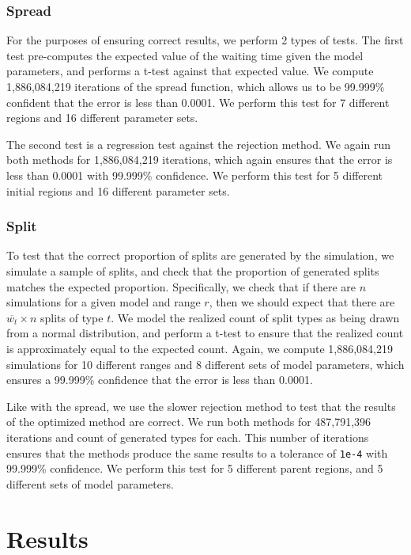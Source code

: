 \documentclass{article}
\begin{document}
\subsubsection{Spread}

For the purposes of ensuring correct results, we perform 2 types of tests.
The first test pre-computes the expected value of the waiting time given the
model parameters, and performs a t-test against that expected value.
We compute 1,886,084,219 iterations of the spread function, which allows us to
be 99.999\% confident that the error is less than 0.0001.
We perform this test for 7 different regions and 16 different parameter sets.

The second test is a regression test against the rejection method.
We again run both methods for 1,886,084,219 iterations, which again ensures
that the error is less than 0.0001 with 99.999\% confidence.
We perform this test for 5 different initial regions and 16 different parameter
sets.

\subsubsection{Split}

To test that the correct proportion of splits are generated by the simulation,
we simulate a sample of splits, and check that the proportion of generated
splits matches the expected proportion.
Specifically, we check that if there are \(n\) simulations for a given model
and range \( r \), then we should expect that there are \(\overline{w_t} \times
n\) splits of type \( t \).
We model the realized count of split types as being drawn from a normal
distribution, and perform a t-test to ensure that the realized count is
approximately equal to the expected count.
Again, we compute 1,886,084,219 simulations for 10 different ranges and 8
different sets of model parameters, which ensures a 99.999\% confidence that
the error is less than 0.0001.

Like with the spread, we use the slower rejection method to test that the
results of the optimized method are correct.
We run both methods for 487,791,396 iterations and count of generated types for
each.
This number of iterations ensures that the methods produce the same results to
a tolerance of \texttt{1e-4} with 99.999\% confidence.
We perform this test for 5 different parent regions, and 5 different sets of
model parameters.

\section{Results}
\end{document}
